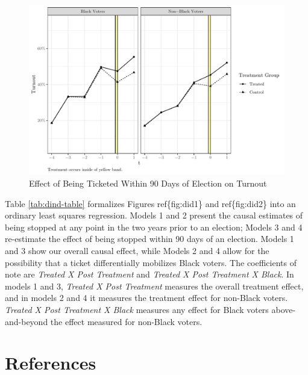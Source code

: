 \documentclass[
  12pt,
]{article}
\begin{document}
\begin{figure}[H]

{\centering \includegraphics{draft_paper_files/figure-latex/did2-1} 

}

\caption{\label{fig:did-2}Effect of Being Ticketed Within 90 Days of Election on Turnout}\label{fig:did2}
\end{figure}

Table \ref{tab:dind-table} formalizes Figures ref\{fig:did1\} and ref\{fig:did2\} into an ordinary least squares regression. Models 1 and 2 present the causal estimates of being stopped at any point in the two years prior to an election; Models 3 and 4 re-estimate the effect of being stopped within 90 days of an election. Models 1 and 3 show our overall causal effect, while Models 2 and 4 allow for the possibility that a ticket differentially mobilizes Black voters. The coefficients of note are \emph{Treated X Post Treatment} and \emph{Treated X Post Treatment X Black}. In models 1 and 3, \emph{Treated X Post Treatment} measures the overall treatment effect, and in models 2 and 4 it measures the treatment effect for non-Black voters. \emph{Treated X Post Treatment X Black} measures any effect for Black voters above-and-beyond the effect measured for non-Black voters.

\begin{singlespace}

\end{singlespace}

\newpage

\hypertarget{references}{%
\section*{References}\label{references}}
\end{document}
